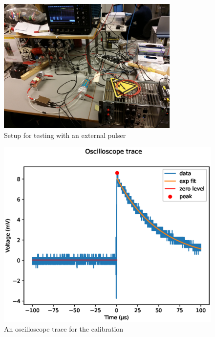 \documentclass[a4paper]{article}
\begin{document}
\begin{figure}[ht!]
\centering
\includegraphics[width=0.8\textwidth]{fig/IMG_20201130_135000.jpg}
\caption{Setup for testing with an external pulser}
\label{fig:pulser_setup}
\end{figure}

\begin{figure}[ht!]
\centering
\includegraphics[width=\textwidth]{fig/python/calibration_trace.eps}
\caption{An oscilloscope trace for the calibration}
\label{fig:cal_trace}
\end{figure}



\FloatBarrier
\end{document}
